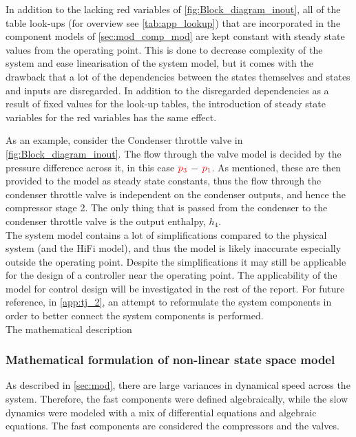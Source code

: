 In addition to the lacking red variables of \cref{fig:Block_diagram_inout}, all of the table look-ups (for overview see \cref{tab:app_lookup}) that are incorporated in the component models of \cref{sec:mod_comp_mod} are kept constant with steady state values from the operating point. This is done to decrease complexity of the system and ease linearisation of the system model, but it comes with the drawback that a lot of the dependencies between the states themselves and states and inputs are disregarded. 
In addition to the disregarded dependencies as a result of fixed values for the look-up tables, the introduction of steady state variables for the red variables has the same effect. 

As an example, consider the Condenser throttle valve in \cref{fig:Block_diagram_inout}. The flow through the valve model is decided by the pressure difference across it, in this case $ \color{red} p_3$ $ - $ $ \color{red} p_1 $. As mentioned, these are then provided to the model as steady state constants, thus the flow through the condenser throttle valve is independent on the condenser outputs, and hence the compressor stage 2. The only thing that is passed from the condenser to the condenser throttle valve is the output enthalpy, $ h_4 $. \\

The system model contains a lot of simplifications compared to the physical system (and the HiFi model), and thus the model is likely inaccurate especially outside the operating point. Despite the simplifications it may still be applicable for the design of a controller near the operating point. The applicability of the model for control design will be investigated in the rest of the report. For future reference, in \cref{app:tj_2}, an attempt to reformulate the system components in order to better connect the system components is performed.\\
The mathematical description 
\subsubsection{Mathematical formulation of non-linear state space model} \label{sec:non_lin_model}
As described in \cref{sec:mod}, there are large variances in dynamical speed across the system. Therefore, the fast components were defined algebraically, while the slow dynamics were modeled with a mix of differential equations and algebraic equations. The fast components are considered the compressors and the valves.


